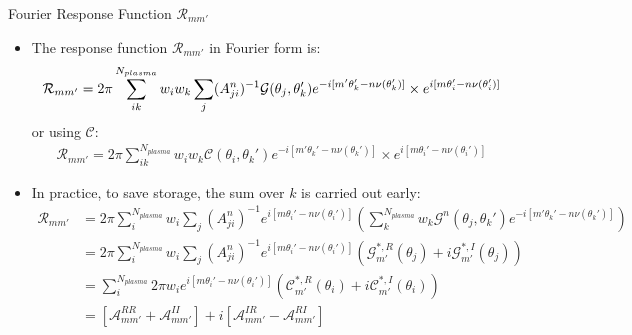 \documentclass[8pt]{beamer}
\begin{document}
\begin{frame}{\color{white} Fourier Response Function $\mathcal{R}_{mm'}$}
\begin{itemize}
    \item The response function $\mathcal{R}_{mm'}$ in Fourier form is:
    \begin{align}
         \mathcal{R}_{mm'} = 2\pi \sum_{ik}^{N_{plasma}} w_i w_k \sum_j (A^n_{ji})^{-1} \mathcal{G}(\theta_j, \theta_k') e^{-i[m'\theta_k' - n\nu(\theta_k')]} \times e^{i[m\theta_i' - n\nu(\theta_i')]} \label{eq:R_{mm'}}
    \end{align}
    or using $\mathcal{C}$:
    \begin{align}
         \mathcal{R}_{mm'} = 2\pi \sum_{ik}^{N_{plasma}} w_i w_k \mathcal{C}(\theta_i, \theta_k') e^{-i[m'\theta_k' - n\nu(\theta_k')]} \times e^{i[m\theta_i' - n\nu(\theta_i')]}
    \end{align}
    \item In practice, to save storage, the sum over $k$ is carried out early:
    \begin{align}
         \mathcal{R}_{mm'} &= 2\pi \sum_{i}^{N_{plasma}} w_i\sum_j (A^n_{ji})^{-1}  e^{i[m\theta_i' - n\nu(\theta_i')]} \left(\sum_{k}^{N_{plasma}}  w_k \mathcal{G}^n(\theta_j, \theta_k') e^{-i[m'\theta_k' - n\nu(\theta_k')]}\right) \\
         &= 2\pi \sum_{i}^{N_{plasma}} w_i\sum_j (A^n_{ji})^{-1}  e^{i[m\theta_i' - n\nu(\theta_i')]} \left(\mathcal{G}^{*,R}_{m'}(\theta_j) + i\mathcal{G}^{*,I}_{m'}(\theta_j) \right) \\
         &= \sum_{i}^{N_{plasma}} 2\pi w_i e^{i[m\theta_i' - n\nu(\theta_i')]} \left(\mathcal{C}^{*,R}_{m'}(\theta_i) + i\mathcal{C}^{*,I}_{m'}(\theta_i) \right) \\
         &= [\mathcal{A}^{RR}_{mm'}+\mathcal{A}^{II}_{mm'}] +i[\mathcal{A}^{IR}_{mm'}-\mathcal{A}^{RI}_{mm'}] \label{eq:R_kernle_from_A}
    \end{align}
\end{itemize}
\end{frame}
\end{document}
